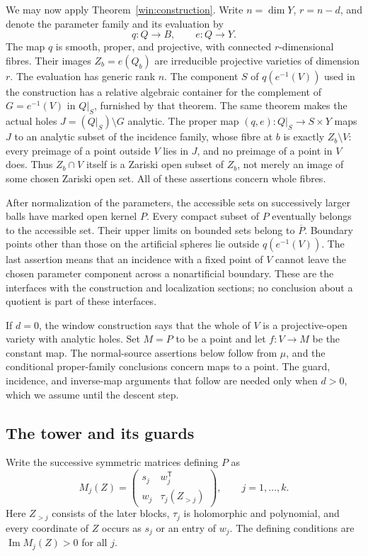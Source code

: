 We may now apply Theorem~\ref{win:construction}. Write \(n=\dim Y\),
\(r=n-d\), and denote the parameter family and its evaluation by
\[
 q:Q\longrightarrow B,\qquad e:Q\longrightarrow Y.
\]
The map \(q\) is smooth, proper, and projective, with connected
\(r\)-dimensional fibres. Their images \(Z_b=e(Q_b)\) are irreducible
projective varieties of dimension \(r\). The evaluation has generic
rank \(n\). The component \(S\) of \(q(e^{-1}(V))\) used in the
construction has a relative algebraic container for the complement
of \(G=e^{-1}(V)\) in \(Q|_S\), furnished by that theorem.
The same theorem makes the actual holes
\(J=(Q|_S)\setminus G\) analytic. The proper map
\((q,e):Q|_S\to S\times Y\) maps \(J\) to an analytic subset
of the incidence family, whose fibre at \(b\) is exactly
\(Z_b\setminus V\): every preimage of a point outside \(V\)
lies in \(J\), and no preimage of a point in \(V\) does.
Thus \(Z_b\cap V\) itself is a Zariski open subset of \(Z_b\),
not merely an image of some chosen Zariski open set.
All of these assertions concern whole fibres.

After normalization of the parameters, the accessible sets on successively
larger balls have marked open kernel \(P\). Every compact subset of
\(P\) eventually belongs to the accessible set. Their upper limits on
bounded sets belong to \(\overline P\). Boundary points other than those
on the artificial spheres lie outside \(q(e^{-1}(V))\). The last
assertion means that an incidence with a fixed point of \(V\) cannot
leave the chosen parameter component across a nonartificial boundary.
These are the interfaces with the construction and localization
sections; no conclusion about a quotient is part of these interfaces.

If \(d=0\), the window construction says that the whole of \(V\)
is a projective-open variety with analytic holes. Set \(M=P\) to
be a point and let \(f:V\to M\) be the constant map. The
normal-source assertions below follow from \(\mu\), and the
conditional proper-family conclusions concern maps to a point.
The guard, incidence, and inverse-map arguments that follow are
needed only when \(d>0\), which we assume until the descent step.

\subsection{The tower and its guards}

Write the successive symmetric matrices defining \(P\) as
\[
 M_j(Z)=
 \begin{pmatrix}s_j&w_j^{\mathsf T}\\w_j&\tau_j(Z_{>j})\end{pmatrix},
 \qquad j=1,\ldots,k.
\]
Here \(Z_{>j}\) consists of the later blocks, \(\tau_j\) is
holomorphic and polynomial, and every coordinate of \(Z\) occurs
as \(s_j\) or an entry of \(w_j\). The defining conditions are
\(\operatorname{Im}M_j(Z)>0\) for all \(j\).

